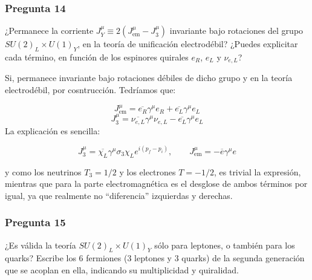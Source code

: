 \vspace*{2em}

\begin{Enunciado}
	\subsubsection*{Pregunta 14}

	¿Permanece la corriente $J_Y^\mu \equiv 2(J^\mu_{\text{em}} - J^\mu_3)$ invariante bajo rotaciones del grupo $SU(2)_L \times U(1)_Y$, en la teoría de unificación electrodébil? ¿Puedes explicitar cada término, en función de los espinores quirales $e_R$, $e_L$ y $\nu_{e,L}$?

\end{Enunciado}

Si, permanece invariante bajo rotaciones débiles de dicho grupo y en la teoría electrodébil, por cosntrucción. Tedríamos que:

\begin{equation}
	J^\mu_{\text{em}} =  \overline{e_R} \gamma^\mu e_R + \overline{e_L} \gamma^\mu e_L
\end{equation}
\begin{equation}
	J^\mu_{3} = \overline{\nu_{e,L}} \gamma^\mu \nu_{e,L}  -  \overline{e_L} \gamma^\mu e_L
\end{equation}
La explicación es sencilla:

\begin{equation*}
	J^\mu_3 = \overline{\chi_L} \gamma^\mu \sigma_3 \chi_L e^{i(p_f - p_i)} , \qquad J^\mu_{\text{em}} = - \overline{e} \gamma^\mu e
\end{equation*}

y como los neutrinos $T_3=1/2$ y los electrones $T=-1/2$, es trivial la expresión, mientras que para la parte electromagnética es el desglose de ambos términos por igual, ya que realmente no ``diferencia'' izquierdas y derechas.


\vspace*{2em}

\begin{Enunciado}
	\subsubsection*{Pregunta 15}

	¿Es válida la teoría $SU(2)_L \times U(1)_Y$ sólo para leptones, o también para los quarks? Escribe los 6 fermiones (3 leptones y 3 quarks) de la segunda generación que se acoplan en ella, indicando su multiplicidad y quiralidad.

\end{Enunciado}

